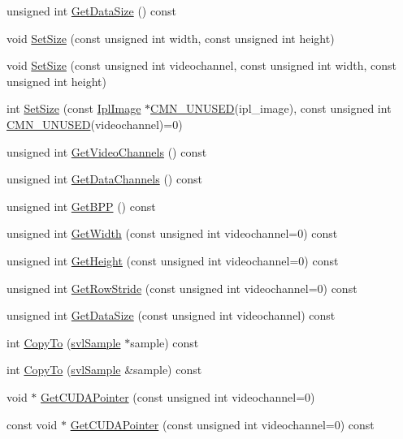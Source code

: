 \begin{DoxyCompactItemize}
unsigned int \hyperlink{classsvl_sample_c_u_d_a_image_custom_a13164006726f6feab443cad5838d9e21}{Get\+Data\+Size} () const 
\item 
void \hyperlink{classsvl_sample_c_u_d_a_image_custom_a2f2ff05dbc7045bc600e3d61762fb96d}{Set\+Size} (const unsigned int width, const unsigned int height)
\item 
void \hyperlink{classsvl_sample_c_u_d_a_image_custom_ab07bd9b726eeb5137a5508a6f8b43043}{Set\+Size} (const unsigned int videochannel, const unsigned int width, const unsigned int height)
\item 
int \hyperlink{classsvl_sample_c_u_d_a_image_custom_ae9853bef52427b9e51e3d0c2a98cd403}{Set\+Size} (const \hyperlink{svl_types_8h_aa5a40a13021ba9708bfe921e18fdfa53}{Ipl\+Image} $\ast$\hyperlink{cmn_portability_8h_a021894e2626935fa2305434b1e893ff6}{C\+M\+N\+\_\+\+U\+N\+U\+S\+E\+D}(ipl\+\_\+image), const unsigned int \hyperlink{cmn_portability_8h_a021894e2626935fa2305434b1e893ff6}{C\+M\+N\+\_\+\+U\+N\+U\+S\+E\+D}(videochannel)=0)
\item 
unsigned int \hyperlink{classsvl_sample_c_u_d_a_image_custom_a01f74e4d6bffe1c868a589d282c4094a}{Get\+Video\+Channels} () const 
\item 
unsigned int \hyperlink{classsvl_sample_c_u_d_a_image_custom_a7f1e6872613762fd4e5575618d61b2ff}{Get\+Data\+Channels} () const 
\item 
unsigned int \hyperlink{classsvl_sample_c_u_d_a_image_custom_a448fb7eaf742ac6cba8fdcfe5e25bb27}{Get\+B\+P\+P} () const 
\item 
unsigned int \hyperlink{classsvl_sample_c_u_d_a_image_custom_a0d0a411f2c9079b065457d2e74a13c1e}{Get\+Width} (const unsigned int videochannel=0) const 
\item 
unsigned int \hyperlink{classsvl_sample_c_u_d_a_image_custom_aa2654e88559a37dd01bfda572d53be38}{Get\+Height} (const unsigned int videochannel=0) const 
\item 
unsigned int \hyperlink{classsvl_sample_c_u_d_a_image_custom_aac061e7c49bfb41bf959ba9a163911d8}{Get\+Row\+Stride} (const unsigned int videochannel=0) const 
\item 
unsigned int \hyperlink{classsvl_sample_c_u_d_a_image_custom_a91f5c83941f02372a8651075c66ff30a}{Get\+Data\+Size} (const unsigned int videochannel) const 
\item 
int \hyperlink{classsvl_sample_c_u_d_a_image_custom_a5418d956d939bacb7d52fd8de68d80ef}{Copy\+To} (\hyperlink{classsvl_sample}{svl\+Sample} $\ast$sample) const 
\item 
int \hyperlink{classsvl_sample_c_u_d_a_image_custom_a59cac1789dd95f42682d641f80481044}{Copy\+To} (\hyperlink{classsvl_sample}{svl\+Sample} \&sample) const 
\item 
void $\ast$ \hyperlink{classsvl_sample_c_u_d_a_image_custom_a2ba32ac11679f0a872c80104d0c25730}{Get\+C\+U\+D\+A\+Pointer} (const unsigned int videochannel=0)
\item 
const void $\ast$ \hyperlink{classsvl_sample_c_u_d_a_image_custom_a5df6887a631918cbad4434329bba7073}{Get\+C\+U\+D\+A\+Pointer} (const unsigned int videochannel=0) const 
\end{DoxyCompactItemize}
